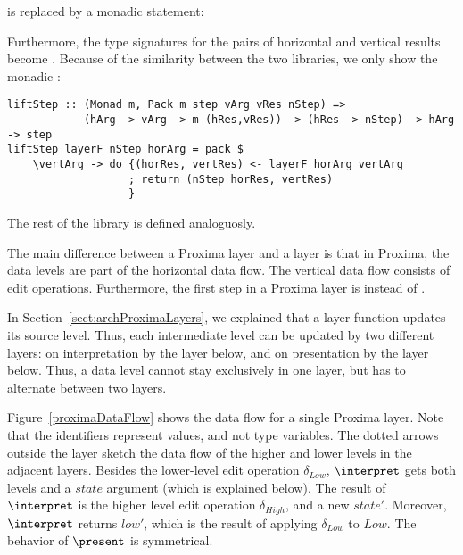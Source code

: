 \documentclass[preprint,natbib]{sigplanconf}
\begin{document}

is replaced by a monadic statement:


Furthermore, the type signatures for the pairs of horizontal and vertical results  become . Because of the similarity between the two libraries, we only show the monadic :

\begin{small}
\begin{verbatim}
liftStep :: (Monad m, Pack m step vArg vRes nStep) => 
            (hArg -> vArg -> m (hRes,vRes)) -> (hRes -> nStep) -> hArg -> step
liftStep layerF nStep horArg = pack $ 
    \vertArg -> do {(horRes, vertRes) <- layerF horArg vertArg
                   ; return (nStep horRes, vertRes)
                   }
\end{verbatim}
\end{small}%

The rest of the library is defined analoguosly.


The main difference between a Proxima layer and a  layer is that in Proxima, the data levels are part of the horizontal data flow. The vertical data flow consists of edit operations. Furthermore, the first step in a Proxima layer is  instead of .

In Section~\ref{sect:archProximaLayers}, we explained that a layer function updates its source level. Thus, each intermediate level can be updated by two different layers: on interpretation by the layer below, and on presentation by the layer below. Thus, a data level cannot stay exclusively in one layer, but has to alternate between two layers.

Figure~\ref{proximaDataFlow} shows the data flow for a single Proxima layer. Note that the identifiers represent values, and not type variables. The dotted arrows outside the layer sketch the data flow of the higher and lower levels in the adjacent layers. Besides the lower-level edit operation $\delta_{Low}$, $\interpret$ gets both levels and a $state$ argument (which is explained below). The result of $\interpret$ is the higher level edit operation $\delta_{High}$, and a new $state'$. Moreover, $\interpret$ returns $low'$, which is the result of applying $\delta_{Low}$ to $Low$. The behavior of $\present$ is symmetrical.
\end{document}
